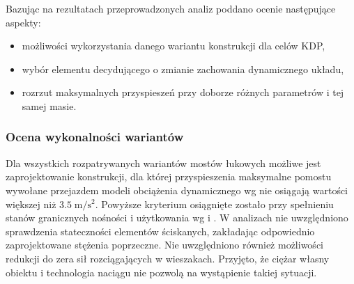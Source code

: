 Bazując na rezultatach przeprowadzonych analiz poddano ocenie następujące aspekty:
\begin{itemize}
\item możliwości wykorzystania danego wariantu konstrukcji dla celów KDP,
\item wybór elementu decydującego o zmianie zachowania dynamicznego układu,
\item rozrzut maksymalnych przyspieszeń przy doborze różnych parametrów i tej samej masie.
\end{itemize}

\subsubsection{Ocena wykonalności wariantów}
Dla wszystkich rozpatrywanych wariantów mostów łukowych możliwe jest zaprojektowanie konstrukcji, dla której przyspieszenia maksymalne pomostu wywołane przejazdem modeli obciążenia dynamicznego wg \cite{PKNj} nie osiągają wartości większej niż $3.5\;\mathrm{m/s^2}$. Powyższe kryterium osiągnięte zostało przy spełnieniu stanów granicznych nośności i użytkowania wg \cite{PKNc} i \cite{PKNj}. W analizach nie uwzględniono sprawdzenia stateczności elementów ściskanych, zakładając odpowiednio zaprojektowane stężenia poprzeczne. Nie uwzględniono również możliwości redukcji do zera sił rozciągających w wieszakach. Przyjęto, że ciężar własny obiektu i technologia naciągu nie pozwolą na wystąpienie takiej sytuacji.

